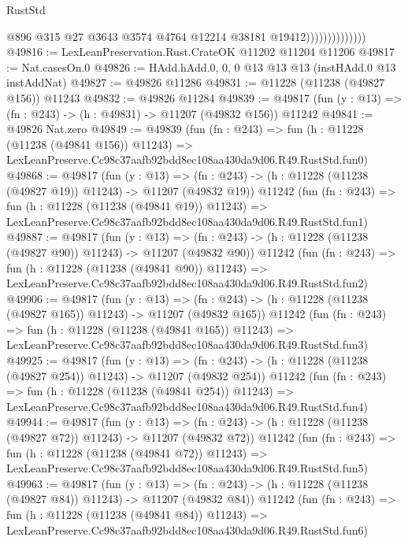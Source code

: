 \begin{lexlean}{RustStd}
\begin{coremodule}
                                @896
                                @315
                                @27
                                @3643
                                @3574
                                @4764
                                @12214
                                @38181
                                @19412))))))))))))))
@49816 := LexLeanPreservation.Rust.CrateOK @11202 @11204 @11206
@49817 := Nat.casesOn.{0}
@49826 := HAdd.hAdd.{0, 0, 0} @13 @13 @13 (instHAdd.{0} @13 instAddNat)
@49827 := @49826 @11286
@49831 := @11228 (@11238 (@49827 @156)) @11243
@49832 := @49826 @11284
@49839 := @49817 (fun (y : @13) => (fn : @243) -> (h : @49831) -> @11207 (@49832 @156)) @11242
@49841 := @49826 Nat.zero
@49849 := @49839
    (fun (fn : @243) =>
    fun (h : @11228 (@11238 (@49841 @156)) @11243) =>
    LexLeanPreserve.Cc98c37aafb92bdd8ec108aa430da9d06.R49.RustStd.fun0)
@49868 := @49817
    (fun (y : @13) =>
    (fn : @243) -> (h : @11228 (@11238 (@49827 @19)) @11243) -> @11207 (@49832 @19))
    @11242
    (fun (fn : @243) =>
    fun (h : @11228 (@11238 (@49841 @19)) @11243) =>
    LexLeanPreserve.Cc98c37aafb92bdd8ec108aa430da9d06.R49.RustStd.fun1)
@49887 := @49817
    (fun (y : @13) =>
    (fn : @243) -> (h : @11228 (@11238 (@49827 @90)) @11243) -> @11207 (@49832 @90))
    @11242
    (fun (fn : @243) =>
    fun (h : @11228 (@11238 (@49841 @90)) @11243) =>
    LexLeanPreserve.Cc98c37aafb92bdd8ec108aa430da9d06.R49.RustStd.fun2)
@49906 := @49817
    (fun (y : @13) =>
    (fn : @243) -> (h : @11228 (@11238 (@49827 @165)) @11243) -> @11207 (@49832 @165))
    @11242
    (fun (fn : @243) =>
    fun (h : @11228 (@11238 (@49841 @165)) @11243) =>
    LexLeanPreserve.Cc98c37aafb92bdd8ec108aa430da9d06.R49.RustStd.fun3)
@49925 := @49817
    (fun (y : @13) =>
    (fn : @243) -> (h : @11228 (@11238 (@49827 @254)) @11243) -> @11207 (@49832 @254))
    @11242
    (fun (fn : @243) =>
    fun (h : @11228 (@11238 (@49841 @254)) @11243) =>
    LexLeanPreserve.Cc98c37aafb92bdd8ec108aa430da9d06.R49.RustStd.fun4)
@49944 := @49817
    (fun (y : @13) =>
    (fn : @243) -> (h : @11228 (@11238 (@49827 @72)) @11243) -> @11207 (@49832 @72))
    @11242
    (fun (fn : @243) =>
    fun (h : @11228 (@11238 (@49841 @72)) @11243) =>
    LexLeanPreserve.Cc98c37aafb92bdd8ec108aa430da9d06.R49.RustStd.fun5)
@49963 := @49817
    (fun (y : @13) =>
    (fn : @243) -> (h : @11228 (@11238 (@49827 @84)) @11243) -> @11207 (@49832 @84))
    @11242
    (fun (fn : @243) =>
    fun (h : @11228 (@11238 (@49841 @84)) @11243) =>
    LexLeanPreserve.Cc98c37aafb92bdd8ec108aa430da9d06.R49.RustStd.fun6)

\end{coremodule}
\end{lexlean}
